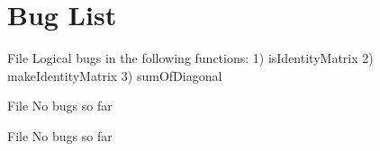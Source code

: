 \chapter{Bug List}
\hypertarget{bug}{}\label{bug}

\begin{DoxyRefList}
\item[File \doxylink{_matrix_8cpp}{Matrix.cpp} ]\label{bug__bug000001}%
%
Logical bugs in the following functions\+: 1) is\+Identity\+Matrix 2) make\+Identity\+Matrix 3) sum\+Of\+Diagonal  
\item[File \doxylink{_matrix_8h}{Matrix.h} ]\label{bug__bug000002}%
%
No bugs so far  
\item[File \doxylink{_source_8cpp}{Source.cpp} ]\label{bug__bug000003}%
%
No bugs so far 
\end{DoxyRefList}